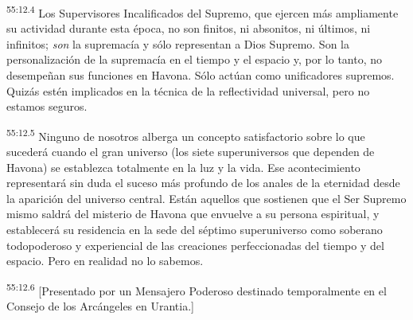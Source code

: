 \par
\textsuperscript{55:12.4} Los Supervisores Incalificados del Supremo, que ejercen más ampliamente su actividad durante esta época, no son finitos, ni absonitos, ni últimos, ni infinitos; \textit{son} la supremacía y sólo representan a Dios Supremo. Son la personalización de la supremacía en el tiempo y el espacio y, por lo tanto, no desempeñan sus funciones en Havona. Sólo actúan como unificadores supremos. Quizás estén implicados en la técnica de la reflectividad universal, pero no estamos seguros.

\par
\textsuperscript{55:12.5} Ninguno de nosotros alberga un concepto satisfactorio sobre lo que sucederá cuando el gran universo (los siete superuniversos que dependen de Havona) se establezca totalmente en la luz y la vida. Ese acontecimiento representará sin duda el suceso más profundo de los anales de la eternidad desde la aparición del universo central. Están aquellos que sostienen que el Ser Supremo mismo saldrá del misterio de Havona que envuelve a su persona espiritual, y establecerá su residencia en la sede del séptimo superuniverso como soberano todopoderoso y experiencial de las creaciones perfeccionadas del tiempo y del espacio. Pero en realidad no lo sabemos.

\par
\textsuperscript{55:12.6} [Presentado por un Mensajero Poderoso destinado temporalmente en el Consejo de los Arcángeles en Urantia.]